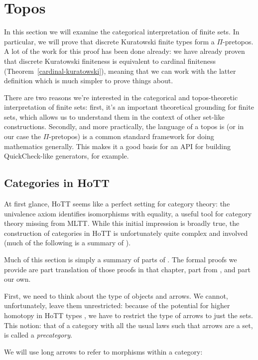 \chapter{Topos} \label{topos}
In this section we will examine the categorical interpretation of finite sets.
In particular, we will prove that discrete Kuratowski finite types form a
\(\Pi\)-pretopos.
A lot of the work for this proof has been done already: we have already proven
that discrete Kuratowski finiteness is equivalent to cardinal finiteness
(Theorem~\ref{cardinal-kuratowski}), meaning that we can work with the latter
definition which is much simpler to prove things about.

There are two reasons we're interested in the categorical and topos-theoretic
interpretation of finite sets: first, it's an important theoretical grounding
for finite sets, which allows us to understand them in the context of other
set-like constructions.
Secondly, and more practically, the language of a topos is (or in our case the
\(\Pi\)-pretopos) is a common standard framework for doing mathematics
generally.
This makes it a good basis for an API for building QuickCheck-like generators,
for example.
\section{Categories in HoTT}
At first glance, HoTT seems like a perfect setting for category theory: the
univalence axiom identifies isomorphisms with equality, a useful tool for
category theory missing from MLTT.
While this initial impression is broadly true, the construction of categories in
HoTT is unfortunately quite complex and involved (much of the following is a
summary of \citet[chapter 9]{hottbook}).

Much of this section is simply a summary of parts of \citet[chapter
9]{hottbook}.
The formal proofs we provide are part translation of those proofs in that
chapter, part from \citep{iversenFredefoxCat2018}
\citep{huProofrelevantCategoryTheory2020}, and part our own.

First, we need to think about the type of objects and arrows.
We cannot, unfortunately, leave them unrestricted: because of the potential for
higher homotopy in HoTT types , we have
to restrict the type of arrows to just the sets.
This notion: that of a category with all the usual laws such that arrows are a
set, is called a \emph{precategory}.
\begin{agdalisting}
\end{agdalisting}
We will use long arrows to refer to morphisms within a category:
\begin{agdalisting}
\end{agdalisting}


